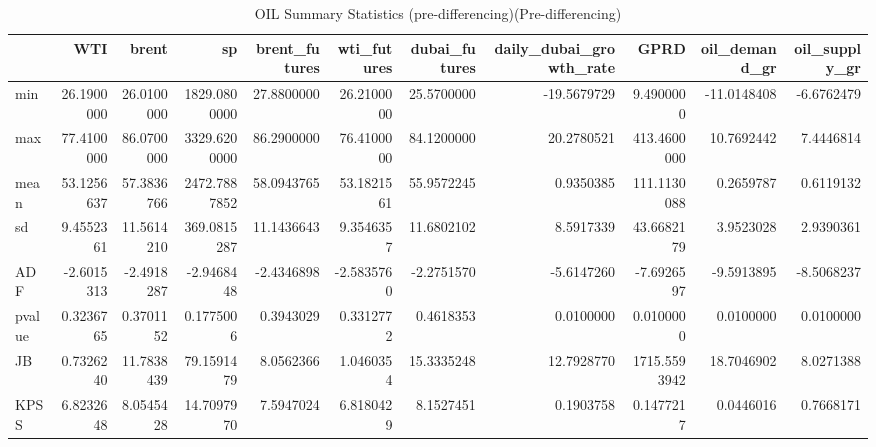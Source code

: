 \begin{table}
\centering
\caption{OIL Summary Statistics (pre-differencing)(Pre-differencing)}
\centering
\begin{tabular}[t]{l|r|r|r|r|r|r|r|r|r|r}
\hline
  & WTI & brent & sp & brent\_futures & wti\_futures & dubai\_futures & daily\_dubai\_growth\_rate & GPRD & oil\_demand\_gr & oil\_supply\_gr\\
\hline
min & 26.1900000 & 26.0100000 & 1829.0800000 & 27.8800000 & 26.2100000 & 25.5700000 & -19.5679729 & 9.4900000 & -11.0148408 & -6.6762479\\
\hline
max & 77.4100000 & 86.0700000 & 3329.6200000 & 86.2900000 & 76.4100000 & 84.1200000 & 20.2780521 & 413.4600000 & 10.7692442 & 7.4446814\\
\hline
mean & 53.1256637 & 57.3836766 & 2472.7887852 & 58.0943765 & 53.1821561 & 55.9572245 & 0.9350385 & 111.1130088 & 0.2659787 & 0.6119132\\
\hline
sd & 9.4552361 & 11.5614210 & 369.0815287 & 11.1436643 & 9.3546357 & 11.6802102 & 8.5917339 & 43.6682179 & 3.9523028 & 2.9390361\\
\hline
ADF & -2.6015313 & -2.4918287 & -2.9468448 & -2.4346898 & -2.5835760 & -2.2751570 & -5.6147260 & -7.6926597 & -9.5913895 & -8.5068237\\
\hline
pvalue & 0.3236765 & 0.3701152 & 0.1775006 & 0.3943029 & 0.3312772 & 0.4618353 & 0.0100000 & 0.0100000 & 0.0100000 & 0.0100000\\
\hline
JB & 0.7326240 & 11.7838439 & 79.1591479 & 8.0562366 & 1.0460354 & 15.3335248 & 12.7928770 & 1715.5593942 & 18.7046902 & 8.0271388\\
\hline
KPSS & 6.8232648 & 8.0545428 & 14.7097970 & 7.5947024 & 6.8180429 & 8.1527451 & 0.1903758 & 0.1477217 & 0.0446016 & 0.7668171\\
\hline
\end{tabular}
\end{table}

